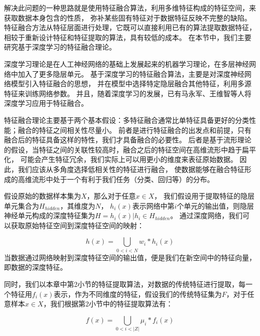 解决此问题的一种思路就是使用特征融合算法，利用多维特征构成的特征空间，来获取数据本身包含的性质，
弥补某些固有特征对于数据特征反映不完整的缺陷。
特征融合方法从特征层面进行处理，它既可以直接利用已有的算法提取数据特征，
相较于重新设计特征和特征提取的算法，具有较低的成本。
在本节中，我们主要研究基于深度学习的特征融合理论。\par

深度学习理论是在人工神经网络的基础上发展起来的机器学习理论，在多层神经网络中加入了更多隐层单元。
基于深度学习的特征融合算法，主要是对深度神经网络模型引入特征融合的思想，
并在模型中选择特定隐层融合其他特征，利用多源特征来训练网络参数。
并且，随着深度学习的发展，已有马永军\cite{马永军2017一种基于深度学习模型的数据融合处理算法}、王维智\cite{王维智2015基于特征提取和特征选择的级联深度学习模型研究}等人将深度学习应用于特征融合。\par

特征融合理论主要基于两个基本假设：多特征融合通常比单特征具备更好的分类性能；融合的特征之间相关性尽量小。
前者是进行特征融合的出发点和前提，只有融合后的特征具备这样的特性，我们才具备融合的必要性。
后者是基于流形理论的假设，当特征之间的关联性较高时，融合之后的特征空间在高维流形中趋于扁平化，
可能会产生特征冗余，我们实际上可以用更小的维度来表征原始数据。
因此，我们应该从多角度选择低相关性的特征进行融合，
使数据能够在融合特征形成的高维流形中处于一个有利于我们任务（分类、回归等）的分布。\par

假设原始的数据样本集为$X$，那么对于任意${x \in X}$，
我们假设用于提取特征的隐层单元集合为$H_{hidden}$，其维度为$N$，
$h_i(x)$表示网络中第$i$个单元的输出值，则隐层神经单元构成的深度特征集为$H={h_i(x)|h_i \in H_{hidden}}$。
通过深度网络，我们可以获取原始特征空间到深度特征空间的映射：\par
\begin{equation}
	\label{eqt_4_15}
	h(x) = \bigcup_{0<i<N} w_i * h_{i}(x)
\end{equation}
当数据通过网络映射到深度特征空间的输出值，便是我们在新空间中的特征向量，即数据的深度特征。\par

同时，我们以本章中第2小节的特征提取算法，对数据的传统特征进行提取，每一个特征用$f_{i}(x)$表示，作为不同维度的特征，假设我们的传统特征集为$F$，对于任意样本$x \in X$，我们根据第2小节中的特征提取算法有：\par
\begin{equation}
	\label{eqt_4_16}
	f(x) = \bigcup_{0<i<|Z|}\mu_{i} * f_{i}(x)
\end{equation}

